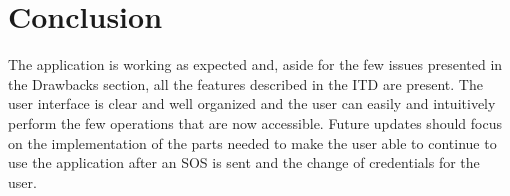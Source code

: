 \section{Conclusion}
The application is working as expected and, aside for the few issues presented in the Drawbacks section, all the features described in the ITD are present.
The user interface is clear and well organized and the user can easily and intuitively perform the few operations that are now accessible.
Future updates should focus on the implementation of the parts needed to make the user able to continue to use the application  after an SOS is sent and the change of credentials for the user.
